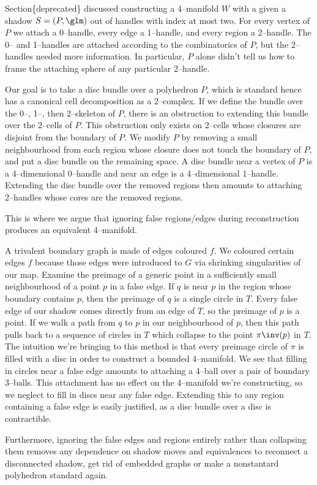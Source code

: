 Section\{deprecated\} discussed constructing a 4--manifold $W$ with a given a shadow $S=(P,\glm)$ out of handles with index at most two.
For every vertex of $P$ we attach a 0--handle, every edge a 1--handle, and every region a 2--handle.
The 0-- and 1--handles are attached according to the combinatorics of $P$, but the 2--handles needed more information.
In particular, $P$ alone didn't tell us how to frame the attaching sphere of any particular 2--handle.

Our goal is to take a disc bundle over a polyhedron $P$, which is standard hence has a canonical cell decomposition as a 2--complex.
If we define the bundle over the 0--, 1--, then 2--skeleton of $P$, there is an obstruction to extending this bundle over the 2--cells of $P$.
This obstruction only exists on 2--cells whose closures are disjoint from the boundary of $P$.
We modify $P$ by removing a small neighbourhood from each region whose closure does not touch the boundary of $P$, and put a disc bundle on the remaining space.
A disc bundle near a vertex of $P$ is a 4--dimensional 0--handle and near an edge is a 4--dimensional 1--handle.
Extending the disc bundle over the removed regions then amounts to attaching 2--handles whose cores are the removed regions.

This is where we argue that ignoring false regions/edges during reconstruction produces an equivalent 4--manifold.

A trivalent boundary graph is made of edges coloured $f$.
We coloured certain edges $f$ because those edges were introduced to $G$ via shrinking singularities of our map.
Examine the preimage of a generic point in a sufficiently small neighbourhood of a point $p$ in a false edge.
If $q$ is near $p$ in the region whose boundary contains $p$, then the preimage of $q$ is a single circle in $T$.
Every false edge of our shadow comes directly from an edge of $T$, so the preimage of $p$ is a point.
If we walk a path from $q$ to $p$ in our neighbourhood of $p$, then this path pulls back to a sequence of circles in $T$ which collapse to the point $\pi\inv(p)$ in $T$.
The intuition we're bringing to this method is that every preimage circle of $\pi$ is filled with a disc in order to construct a bounded 4--manifold.
We see that filling in circles near a false edge amounts to attaching a 4--ball over a pair of boundary 3--balls.
This attachment has no effect on the 4--manifold we're constructing, so we neglect to fill in discs near any false edge.
Extending this to any region containing a false edge is easily justified, as a disc bundle over a disc is contractible.

Furthermore, ignoring the false edges and regions entirely rather than collapsing them removes any dependence on shadow moves and equivalences to reconnect a disconnected shadow, get rid of embedded graphs or make a nonstantard polyhedron standard again.
